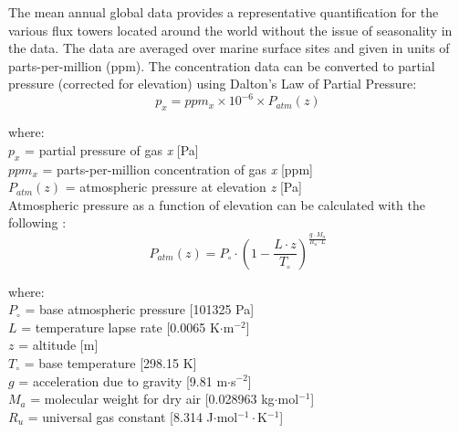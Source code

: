 The mean annual global data provides a representative quantification for the various flux towers located around the world without the issue of seasonality in the data.  
The data are averaged over marine surface sites and given in units of parts-per-million (ppm). 
The concentration data can be converted to partial pressure (corrected for elevation) using Dalton's Law of Partial Pressure:
\begin{equation}
\label{eq:pp}
    p_x = ppm_x \times 10^{-6} \times P_{atm}\left( z \right)
\end{equation}

\noindent where:\\
\indent $p_x$ = partial pressure of gas \textit{x} [Pa]\\
\indent $ppm_x$ = parts-per-million concentration of gas \textit{x} [ppm]\\
\indent $P_{atm}\left( z \right)$ = atmospheric pressure at elevation \textit{z} [Pa]\\

Atmospheric pressure as a function of elevation can be calculated with the following \parencite{cavcar00}:
%
%
%
%
%
%
\begin{equation}
\label{eq:pz}
    P_{atm}\left( z \right) = P_{\circ} \cdot \left( 
    	1 - \frac{L \cdot z}{T_{\circ}} 
    \right)^{\frac{g \cdot M_a}{R_u \cdot L}}
\end{equation}

\noindent where:\\
\indent $P_{\circ}$ = base atmospheric pressure [101325 Pa]\\
\indent $L$ = temperature lapse rate [0.0065 K$\cdot$m$^{-2}$]\\
\indent $z$ = altitude [m]\\
\indent $T_{\circ}$ = base temperature [298.15 K]\\
\indent $g$ = acceleration due to gravity [9.81 m$\cdot$s$^{-2}$]\\
\indent $M_a$ = molecular weight for dry air [0.028963 kg$\cdot$mol$^{-1}$]\\
\indent $R_u$ = universal gas constant [8.314 J$\cdot$mol$^{-1}\cdot$K$^{-1}$]\\

